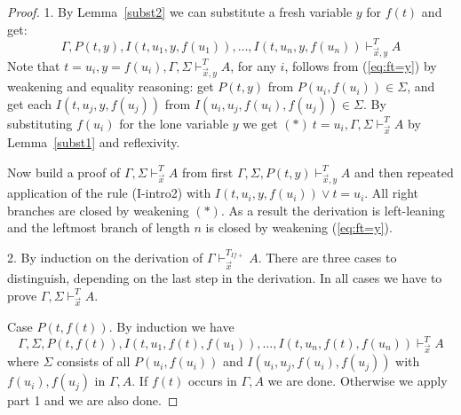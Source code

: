 \documentclass[10pt,a4paper]{article}
\begin{document}
\begin{proof}
1. By Lemma~\ref{subst2} we can substitute a fresh variable $y$ for $f(t)$ and get:
\begin{equation}\label{eq:ft=y}
\Gamma,P(t,y),  I(t,u_1,y,f(u_1)),\ldots,I(t,u_n,y,f(u_n))\vdash_{\vec{x},y}^{T} A
\end{equation}
Note that $t=u_i,y=f(u_i),\Gamma,\Sigma\vdash_{\vec{x},y}^{T} A$,
for any $i$, follows from (\ref{eq:ft=y}) by weakening and equality reasoning:
get $P(t,y)$ from $P(u_i,f(u_i))\in\Sigma$, and get each $I(t,u_j,y,f(u_j))$ 
from $I(u_i,u_j,f(u_i),f(u_j))\in\Sigma$. 
By substituting $f(u_i)$ for the
lone variable $y$ we get $(\ast)~t=u_i,\Gamma,\Sigma\vdash_{\vec{x}}^{T} A$
by Lemma~\ref{subst1} and reflexivity.

Now build a proof of $\Gamma,\Sigma\vdash_{\vec{x}}^{T} A$ from first 
$\Gamma,\Sigma,P(t,y)\vdash_{\vec{x},y}^{T} A$ and then repeated
application of the rule (I-intro2) with $I(t,u_i,y,f(u_i)) \lor t=u_i$. 
All right branches are closed by weakening  $(\ast)$. As a result the derivation
is left-leaning and the leftmost branch of length $n$ is closed by
weakening (\ref{eq:ft=y}).

2. By induction on the derivation of $\Gamma\vdash_{\vec{x}}^{T_{I\!f{+}}} A$.
There are three cases to distinguish, depending on the last step in the derivation.
In all cases we have to prove $\Gamma,\Sigma\vdash_{\vec{x}}^{T} A$.

Case $P(t,f(t))$. By induction we have 
\begin{equation}\label{ih:Ptft}
\Gamma,\Sigma,P(t,f(t)), I(t,u_1,f(t),f(u_1)),\ldots,I(t,u_n,f(t),f(u_n))\vdash_{\vec{x}}^{T} A
\end{equation}
where $\Sigma$ consists of all $P(u_i,f(u_i))$ and $I(u_i,u_j,f(u_i),f(u_j))$
with $f(u_i),f(u_j)$ in $\Gamma,A$. 
If $f(t)$ occurs in $\Gamma,A$ we are done.
Otherwise we apply part 1 and we are also done.


\end{proof}
\end{document}
